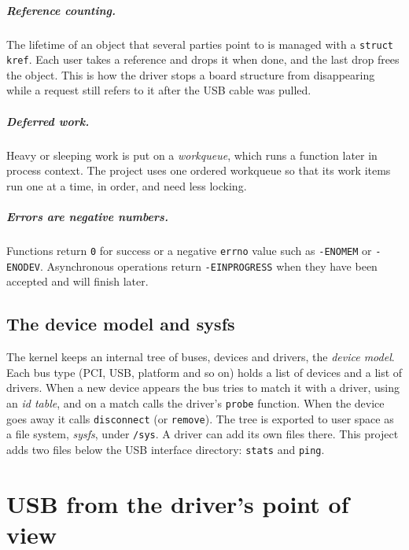 \documentclass[11pt,a4paper,oneside]{report}
\newcommand{\code}[1]{\texttt{\small #1}}
\begin{document}
\paragraph{Reference counting.} The lifetime of an object that several parties point to is managed with a \code{struct kref}. Each user takes a reference and drops it when done, and the last drop frees the object. This is how the driver stops a board structure from disappearing while a request still refers to it after the USB cable was pulled.

\paragraph{Deferred work.} Heavy or sleeping work is put on a \emph{workqueue}, which runs a function later in process context. The project uses one ordered workqueue so that its work items run one at a time, in order, and need less locking.

\paragraph{Errors are negative numbers.} Functions return \code{0} for success or a negative \code{errno} value such as \code{-ENOMEM} or \code{-ENODEV}. Asynchronous operations return \code{-EINPROGRESS} when they have been accepted and will finish later.

\section{The device model and sysfs}

The kernel keeps an internal tree of buses, devices and drivers, the \emph{device model}. Each bus type (PCI, USB, platform and so on) holds a list of devices and a list of drivers. When a new device appears the bus tries to match it with a driver, using an \emph{id table}, and on a match calls the driver's \code{probe} function. When the device goes away it calls \code{disconnect} (or \code{remove}). The tree is exported to user space as a file system, \emph{sysfs}, under \code{/sys}. A driver can add its own files there. This project adds two files below the USB interface directory: \code{stats} and \code{ping}.



\chapter{USB from the driver's point of view}\label{ch:usb}
\end{document}
